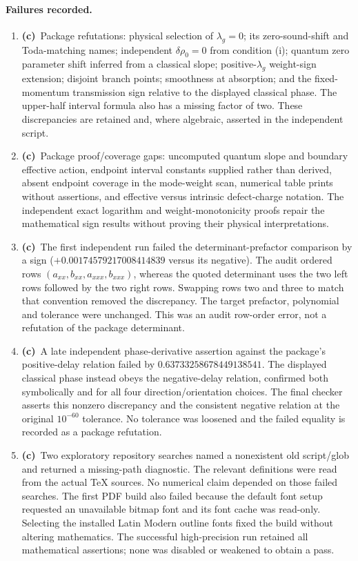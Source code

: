 \documentclass[11pt,a4paper]{article}
\newcommand{\Lc}{\textbf{(c)}\ }
\begin{document}
\paragraph{Failures recorded.}
\begin{enumerate}
\item \Lc Package refutations: physical selection of $\lambda_g=0$;
its zero-sound-shift and Toda-matching names; independent $\delta\rho_0=0$
from condition (i); quantum zero parameter shift inferred from a classical
slope; positive-$\lambda_g$ weight-sign extension; disjoint branch points;
smoothness at absorption; and the fixed-momentum transmission sign relative
to the displayed classical phase. The upper-half interval formula also has a
missing factor of two. These discrepancies are retained and, where
algebraic, asserted in the independent script.
\item \Lc Package proof/coverage gaps: uncomputed quantum slope and
boundary effective action, endpoint interval constants supplied rather than
derived, absent endpoint coverage in the mode-weight scan, numerical table
prints without assertions, and effective versus intrinsic defect-charge
notation. The independent exact logarithm and weight-monotonicity proofs
repair the mathematical sign results without proving their physical
interpretations.
\item \Lc The first independent run failed the determinant-prefactor
comparison by a sign ($+0.00174579217008414839$ versus its negative).
The audit ordered rows $(a_{xx},b_{xx},a_{xxx},b_{xxx})$, whereas the
quoted determinant uses the two left rows followed by the two right rows.
Swapping rows two and three to match that convention removed the discrepancy.
The target prefactor, polynomial and tolerance were unchanged. This was an
audit row-order error, not a refutation of the package determinant.
\item \Lc A late independent phase-derivative assertion against the
package's positive-delay relation failed by $0.63733258678449138541$.
The displayed classical phase instead obeys the negative-delay relation,
confirmed both symbolically and for all four direction/orientation choices.
The final checker asserts this nonzero discrepancy and the consistent
negative relation at the original $10^{-60}$ tolerance. No tolerance was
loosened and the failed equality is recorded as a package refutation.
\item \Lc Two exploratory repository searches named a nonexistent old
script/glob and returned a missing-path diagnostic. The relevant definitions
were read from the actual TeX sources. No numerical claim depended on those
failed searches. The first PDF build also failed because the default font setup requested
an unavailable bitmap font and its font cache was read-only. Selecting
the installed Latin Modern outline fonts fixed the build without altering
mathematics. The successful high-precision run retained all mathematical
assertions; none was disabled or weakened to obtain a pass.
\end{enumerate}
\end{document}

